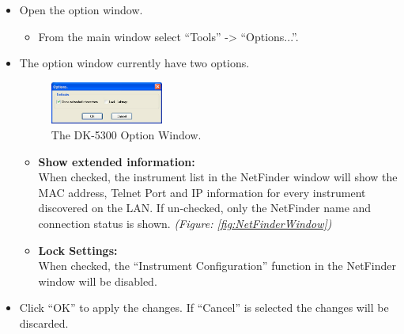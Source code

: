 \begin{itemize}
\item Open the option window.
	\begin{itemize}
		\item From the main window select ``Tools'' -> ``Options...''.
	\end{itemize}
\item The option window currently have two options.

\begin{figure}[hbt]
\centering
\includegraphics[width=0.35\textwidth]{fig/DK5300_Options}
\caption{The DK-5300 Option Window.\label{fig:DK5300OptionWindow}}
\end{figure}
	\begin{itemize}
		\item \textbf{Show extended information:}\\When checked, the instrument list in the NetFinder window will show the MAC address, Telnet Port and IP information for every instrument discovered on the LAN. If un-checked, only the NetFinder name and connection status is shown. \textit{(Figure: \ref{fig:NetFinderWindow})}
		\item \textbf{Lock Settings:}\\When checked, the ``Instrument Configuration'' function in the NetFinder window will be disabled.
	\end{itemize}
\item Click ``OK'' to apply the changes. If ``Cancel'' is selected the changes will be discarded.
\end{itemize}

\clearpage
